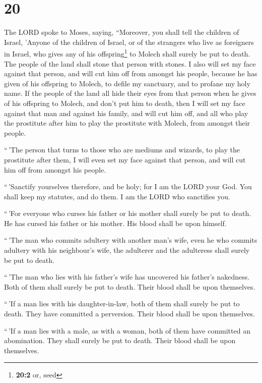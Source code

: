 \hypertarget{section-19}{%
\section{20}\label{section-19}}

 The LORD spoke to Moses, saying, 
``Moreover, you shall tell the children of Israel, 'Anyone of the
children of Israel, or of the strangers who live as foreigners in
Israel, who gives any of his offspring\footnote{\textbf{20:2} or, seed}
to Molech shall surely be put to death. The people of the land shall
stone that person with stones.  I also will set my face
against that person, and will cut him off from amongst his people,
because he has given of his offspring to Molech, to defile my sanctuary,
and to profane my holy name.  If the people of the land
all hide their eyes from that person when he gives of his offspring to
Molech, and don't put him to death,  then I will set my
face against that man and against his family, and will cut him off, and
all who play the prostitute after him to play the prostitute with
Molech, from amongst their people.

 ``\,'The person that turns to those who are mediums and
wizards, to play the prostitute after them, I will even set my face
against that person, and will cut him off from amongst his people.

 ``\,'Sanctify yourselves therefore, and be holy; for I am
the LORD your God.  You shall keep my statutes, and do
them. I am the LORD who sanctifies you.

 ``\,'For everyone who curses his father or his mother
shall surely be put to death. He has cursed his father or his mother.
His blood shall be upon himself.

 ``\,'The man who commits adultery with another man's
wife, even he who commits adultery with his neighbour's wife, the
adulterer and the adulteress shall surely be put to death.

 ``\,'The man who lies with his father's wife has
uncovered his father's nakedness. Both of them shall surely be put to
death. Their blood shall be upon themselves.

 ``\,'If a man lies with his daughter-in-law, both of
them shall surely be put to death. They have committed a perversion.
Their blood shall be upon themselves.

 ``\,'If a man lies with a male, as with a woman, both of
them have committed an abomination. They shall surely be put to death.
Their blood shall be upon themselves.


